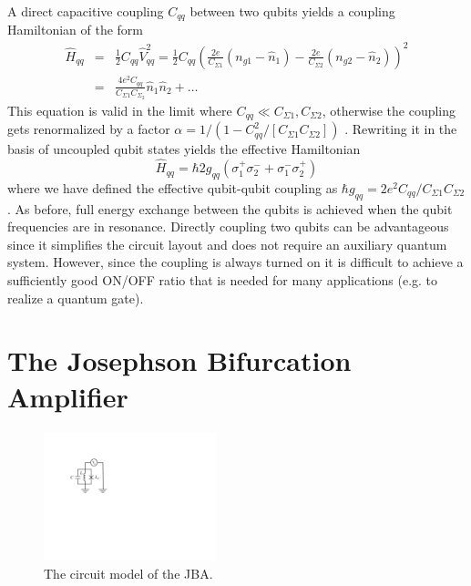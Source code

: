 A direct capacitive coupling $C_{qq}$ between two qubits yields a coupling Hamiltonian of the form
%
\begin{eqnarray}
\hat{H}_{qq} & = & \frac{1}{2}C_{qq}\hat{V}_{qq}^2 = \frac{1}{2}C_{qq}\left(\frac{2e}{C_{\Sigma 1}}(n_{g1}-\hat{n}_1)-\frac{2e}{C_{\Sigma 2}}(n_{g2}-\hat{n}_2)\right)^2 \\
& = & \frac{4e^2 C_{qq}}{C_{\Sigma 1}C_{\Sigma_2}}\hat{n}_1\hat{n}_2+\hdots \label{eq:cqed_capacitive_coupling}
\end{eqnarray}
%
This equation is valid in the limit where $C_{qq} \ll C_{\Sigma 1},C_{\Sigma 2}$, otherwise the coupling gets renormalized by a factor $\alpha = 1/(1-C_{qq}^2/[C_{\Sigma 1}C_{\Sigma 2}])$ \citep{nguyen_cooper_2008}. Rewriting it in the basis of uncoupled qubit states yields the effective Hamiltonian
%
\begin{equation}
\hat{H}_{qq} = \hbar 2 g_{qq}\left(\sigma^+_1\sigma^-_2+\sigma^-_1\sigma^+_2\right) \label{eq:cqed_qubit_interaction_hamiltonian}
\end{equation}
%
where we have defined the effective qubit-qubit coupling as $\hbar g_{qq} = 2e^2 C_{qq}/C_{\Sigma 1}C_{\Sigma 2}$. As before, full energy exchange between the qubits is achieved when the qubit frequencies are in resonance. Directly coupling two qubits can be advantageous since it simplifies the circuit layout and does not require an auxiliary quantum system. However, since the coupling is always turned on it is difficult to achieve a sufficiently good ON/OFF ratio that is needed for many applications (e.g. to realize a quantum gate).

\section{The Josephson Bifurcation Amplifier}

\begin{figure}
	\includegraphics[width=5cm]{"./material/figures/introduction/nonlinear resonator"}
	\caption{The circuit model of the JBA.}
	\label{fig:jba_schematic}
\end{figure}

